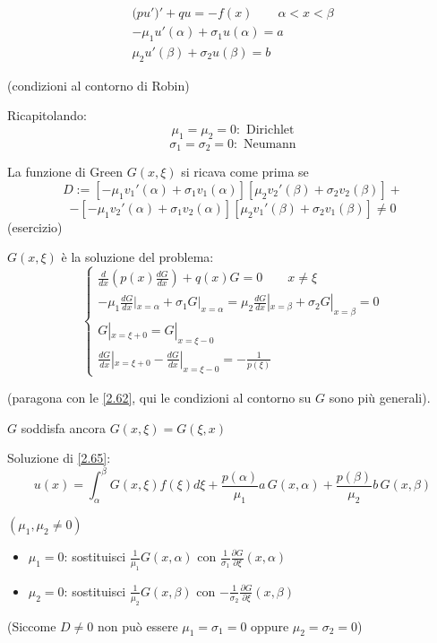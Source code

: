 \documentclass[a4paper,11pt]{report}
\begin{document}
\begin{equation}
\begin{gathered}
\big(pu'\big)' + qu = -f(x) \qquad \alpha<x<\beta\\
-\mu_1 u'(\alpha) + \sigma_1 u(\alpha)=a\\
\mu_2 u'(\beta) + \sigma_2 u(\beta)=b
\end{gathered}
\label{2.65}
\end{equation}
\centerline{(condizioni al contorno di Robin)}

\medskip

Ricapitolando:
\[
\mu_1=\mu_2=0:\text{ Dirichlet}
\]
\[
\sigma_1=\sigma_2=0:\text{ Neumann}
\]	

La funzione di Green $G(x,\xi)$ si ricava come prima se
\[
D:=\left[-\mu_1 v_1'(\alpha)+\sigma_1 v_1(\alpha)\right] \left[\mu_2 v_2'(\beta)+\sigma_2 v_2(\beta)\right] +
\]
\[
- \left[-\mu_1 v_2'(\alpha)+\sigma_1 v_2(\alpha)\right] \left[\mu_2 v_1'(\beta)+\sigma_2 v_1(\beta)\right]\neq 0
\]
(esercizio)

$G(x,\xi)$ \`e la soluzione del problema:
\begin{equation}
\begin{cases}
\frac{d}{dx}\left(p(x)\frac{dG}{dx}\right) + q(x)G = 0 \qquad x\neq \xi \\
-\mu_1\frac{dG}{dx}|_{x=\alpha}+\sigma_1 G|_{x=\alpha}=\mu_2\frac{dG}{dx}|_{x=\beta} + \sigma_2 G|_{x=\beta}=0 \\
G|_{x=\xi+0}=G|_{x=\xi-0}\\
\frac{dG}{dx}|_{x=\xi+0}-\frac{dG}{dx}|_{x=\xi-0}=-\frac{1}{p(\xi)}
\end{cases}
\end{equation}

(paragona con le \eqref{2.62}, qui le condizioni al contorno su $G$ sono pi\`u generali).

\smallskip

$G$ soddisfa ancora $G(x,\xi)=G(\xi,x)$

\smallskip

Soluzione di \eqref{2.65}:
\begin{equation}
u(x)=\int_\alpha^\beta G(x,\xi)f(\xi)d\xi + \frac{p(\alpha)}{\mu_1}a\,G(x,\alpha) + \frac{p(\beta)}{\mu_2}b\,G(x,\beta)
\label{2.67}
\end{equation}

$(\mu_1,\mu_2\neq 0)$
\begin{itemize}
\item $\mu_1=0$: sostituisci $\frac{1}{\mu_1}G(x,\alpha)$ con $\frac{1}{\sigma_1}\frac{\partial G}{\partial \xi}(x,\alpha)$
\item $\mu_2=0$: sostituisci $\frac{1}{\mu_2}G(x,\beta)$ con $-\frac{1}{\sigma_2}\frac{\partial G}{\partial \xi}(x,\beta)$
\end{itemize}
(Siccome $D\neq 0$ non pu\`o essere $\mu_1=\sigma_1=0$ oppure $\mu_2=\sigma_2=0$)
\end{document}
